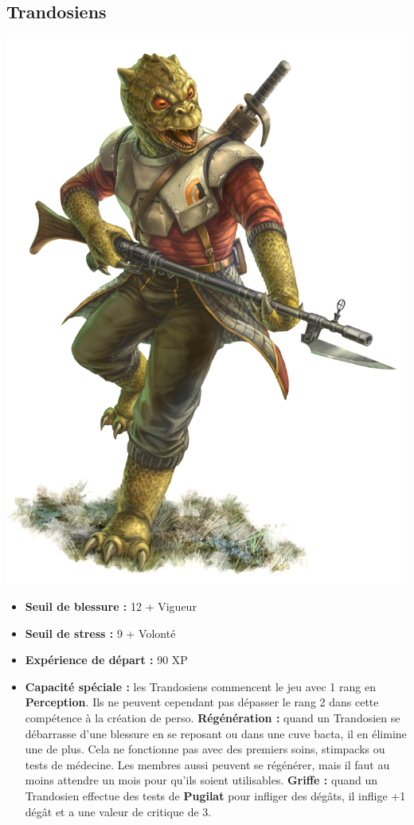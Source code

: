 \documentclass[twoside]{article}
\begin{document}
\subsection*{Trandosiens}

\noindent\begin{minipage}{0.3\textwidth}
	\includegraphics[width=1\linewidth]{../_img/species/trandoshan}
\end{minipage}%
\hfill%
\begin{minipage}{0.7\textwidth}\raggedleft
	\begin{itemize}
		\item \textbf{Seuil de blessure :} 12 + Vigueur 
		\item \textbf{Seuil de stress :} 9 + Volonté 
		\item \textbf{Expérience de départ :} 90 XP
		\item \textbf{Capacité spéciale :} les Trandosiens commencent le jeu avec 1 rang en \textbf{Perception}. Ils ne peuvent cependant pas dépasser le rang 2 dans cette compétence à la création de perso. \textbf{Régénération :} quand un Trandosien se débarrasse d'une blessure en se reposant ou dans une cuve bacta, il en élimine une de plus. Cela ne fonctionne pas avec des premiers soins, stimpacks ou tests de médecine. Les membres aussi peuvent se régénérer, mais il faut au moins attendre un mois pour qu'ils soient utilisables. \textbf{Griffe :} quand un Trandosien effectue des tests de \textbf{Pugilat} pour infliger des dégâts, il inflige +1 dégât et a une valeur de critique de 3.
	\end{itemize}
\end{minipage}
\end{document}
